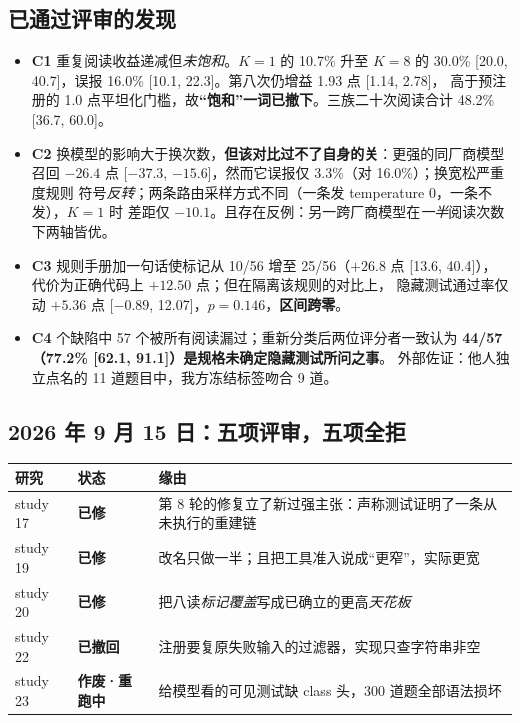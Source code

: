 \documentclass[11pt,a4paper]{article}
\newcommand{\ok}[1]{\textcolor{acc}{\textbf{#1}}}
\newcommand{\hold}[1]{\textcolor{warn}{\textbf{#1}}}
\newcommand{\bad}[1]{\textcolor{dead}{\textbf{#1}}}
\begin{document}
\subsection{已通过评审的发现}

\begin{itemize}
\item \ok{C1}\; 重复阅读收益递减但\emph{未饱和}。$K{=}1$ 的 10.7\% 升至 $K{=}8$ 的
      30.0\% [20.0, 40.7]，误报 16.0\% [10.1, 22.3]。第八次仍增益 1.93 点 [1.14, 2.78]，
      高于预注册的 1.0 点平坦化门槛，故\textbf{“饱和”一词已撤下}。三族二十次阅读合计
      48.2\% [36.7, 60.0]。
\item \ok{C2}\; 换模型的影响大于换次数，\textbf{但该对比过不了自身的关}：更强的同厂商模型
      召回 $-26.4$ 点 [$-37.3$, $-15.6$]，然而它误报仅 3.3\%（对 16.0\%）；换宽松严重度规则
      符号\emph{反转}；两条路由采样方式不同（一条发 temperature 0，一条不发），$K{=}1$ 时
      差距仅 $-10.1$。且存在反例：另一跨厂商模型在\emph{一半}阅读次数下两轴皆优。
\item \ok{C3}\; 规则手册加一句话使标记从 10/56 增至 25/56（$+26.8$ 点 [13.6, 40.4]），
      代价为正确代码上 $+12.50$ 点；但在隔离该规则的对比上，
      隐藏测试通过率仅动 $+5.36$ 点 [$-0.89$, 12.07]，$p=0.146$，\textbf{区间跨零}。
\item \ok{C4} 个缺陷中 57 个被所有阅读漏过；重新分类后两位评分者一致认为
      \textbf{44/57（77.2\% [62.1, 91.1]）是规格未确定隐藏测试所问之事}。
      外部佐证：他人独立点名的 11 道题目中，我方冻结标签吻合 9 道。
\end{itemize}

\subsection{2026 年 9 月 15 日：五项评审，五项全拒}

\begin{center}
\begin{tabular}{@{}lll@{}}
\toprule
\textbf{研究} & \textbf{状态} & \textbf{缘由} \\
\midrule
study 17 & \hold{已修} & 第 8 轮的修复立了新过强主张：声称测试证明了一条从未执行的重建链 \\
study 19 & \hold{已修} & 改名只做一半；且把工具准入说成“更窄”，实际更宽 \\
study 20 & \hold{已修} & 把八读\emph{标记覆盖}写成已确立的更高\emph{天花板} \\
study 22 & \bad{已撤回} & 注册要复原失败输入的过滤器，实现只查字符串非空 \\
study 23 & \bad{作废·重跑中} & 给模型看的可见测试缺 class 头，300 道题全部语法损坏 \\
\bottomrule
\end{tabular}
\end{center}
\end{document}
